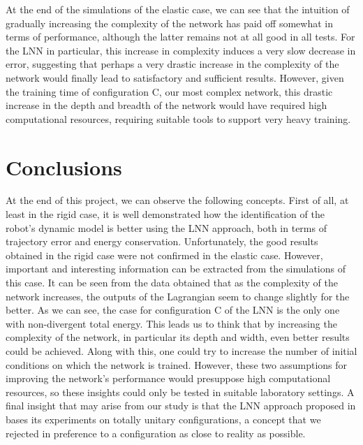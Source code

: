 \documentclass[a4paper]{article}
\begin{document}
At the end of the simulations of the elastic case, we can see that the intuition of gradually increasing the complexity of the network has paid off somewhat in terms of performance, although the latter remains not at all good in all tests. For the LNN in particular, this increase in complexity induces a very slow decrease in error, suggesting that perhaps a very drastic increase in the complexity of the network would finally lead to satisfactory and sufficient results. However, given the training time of configuration C, our most complex network, this drastic increase in the depth and breadth of the network would have required high computational resources, requiring suitable tools to support very heavy training.\\


\section{Conclusions}
At the end of this project, we can observe the following concepts. First of all, at least in the rigid case, it is well demonstrated how the identification of the robot's dynamic model is better using the LNN approach, both in terms of trajectory error and energy conservation. Unfortunately, the good results obtained in the rigid case were not confirmed in the elastic case. However, important and interesting information can be extracted from the simulations of this case. It can be seen from the data obtained that as the complexity of the network increases, the outputs of the Lagrangian seem to change slightly for the better. As we can see, the case for configuration C of the LNN is the only one with non-divergent total energy. This leads us to think that by increasing the complexity of the network, in particular its depth and width, even better results could be achieved. Along with this, one could try to increase the number of initial conditions on which the network is trained. However, these two assumptions for improving the network's performance would presuppose high computational resources, so these insights could only be tested in suitable laboratory settings. A final insight that may arise from our study is that the LNN approach proposed in \cite{lnncranmer} bases its experiments on totally unitary configurations, a concept that we rejected in preference to a configuration as close to reality as possible.


\end{document}
